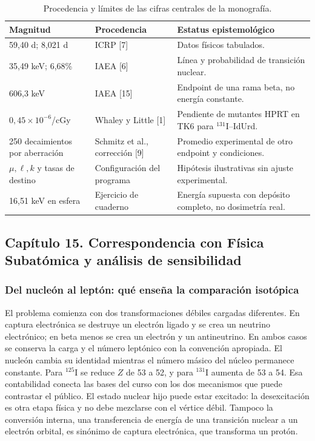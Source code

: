 \documentclass[11pt,a4paper,oneside]{article}
\begin{document}
\begin{table}[htbp]\centering\footnotesize
\begin{tabularx}{\linewidth}{@{}p{.24\linewidth}p{.31\linewidth}X@{}}
\toprule Magnitud & Procedencia & Estatus epistemológico \\\midrule
59,40 d; 8,021 d & ICRP [7] & Datos físicos tabulados. \\
35,49 keV; 6,68\% & IAEA [6] & Línea y probabilidad de transición nuclear. \\
606,3 keV & IAEA [15] & Endpoint de una rama beta, no energía constante. \\
$0,45\times10^{-6}$/cGy & Whaley y Little [1] & Pendiente de mutantes HPRT en TK6 para $^{131}$I--IdUrd. \\
250 decaimientos por aberración & Schmitz et al., corrección [9] & Promedio experimental de otro endpoint y condiciones. \\
$\mu,\ell,k$ y tasas de destino & Configuración del programa & Hipótesis ilustrativas sin ajuste experimental. \\
16,51 keV en esfera & Ejercicio de cuaderno & Energía supuesta con depósito completo, no dosimetría real. \\\bottomrule
\end{tabularx}
\caption{Procedencia y límites de las cifras centrales de la monografía.}
\end{table}

\clearpage
\subsection{Capítulo 15. Correspondencia con Física Subatómica y análisis de sensibilidad}
\label{ampliacion-programa}

\subsubsection{Del nucleón al leptón: qué enseña la comparación isotópica}
El problema comienza con dos transformaciones débiles cargadas diferentes.
En captura electrónica se destruye un electrón ligado y se crea un
neutrino electrónico; en beta menos se crea un electrón y un
antineutrino. En ambos casos se conserva la carga y el número leptónico
con la convención apropiada. El nucleón cambia su identidad mientras
el número másico del núcleo permanece constante. Para $^{125}$I se
reduce $Z$ de 53 a 52, y para $^{131}$I aumenta de 53 a 54. Esa
contabilidad conecta las bases del curso con los dos mecanismos que
puede contrastar el público. El estado nuclear hijo puede estar excitado:
la desexcitación es otra etapa física y no debe mezclarse con el vértice
débil. Tampoco la conversión interna, una transferencia de energía de
una transición nuclear a un electrón orbital, es sinónimo de captura
electrónica, que transforma un protón.
\end{document}
